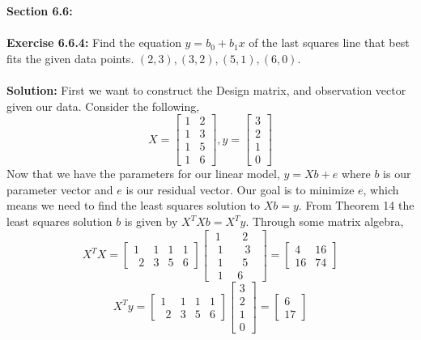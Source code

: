 \documentclass{amsart}
\begin{document}
\thispagestyle{fancy}





{\huge\textbf{Section 6.6:}}\\\\
\noindent\textbf{Exercise 6.6.4: } Find the equation $y = b_0 + b_1x$ of the last squares line that best fits the given data points. $(2,3), (3,2), (5,1), (6,0)$.\\\\
\noindent \textbf{Solution: } First we want to construct the Design matrix, and observation vector given our data. Consider the following,
\begin{equation*}
X = 
\begin{bmatrix}
 1 &   2   \\
 1 &    3  \\
 1 &   5 \\
 1& 6
\end{bmatrix}
,
y = 
\begin{bmatrix}
3\\
2\\
1\\
0
\end{bmatrix}
\end{equation*}
Now that we have the parameters for our linear model, $y  = Xb + e$ where $b$ is our parameter vector and $e$ is our residual vector. Our goal is to minimize $e$, which means we need to find the least squares solution to $Xb = y$. From Theorem 14 the least squares solution $b$ is given by $X^TXb = X^Ty$. Through some matrix algebra,
\begin{equation*}
X^TX = \begin{bmatrix}1&1&1&1\\ \:\:2&3&5&6\end{bmatrix}\begin{bmatrix}\:1\:&\:\:\:2\:\:\:\\ \:\:1\:&\:\:\:\:3\:\:\\ \:\:1\:&\:\:\:5\:\\ \:\:1&\:6\end{bmatrix}
 = 
\begin{bmatrix}4&16\\ 16&74\end{bmatrix}
\end{equation*}
\begin{equation*}
X^Ty =  \begin{bmatrix}1&1&1&1\\ \:\:2&3&5&6\end{bmatrix}\begin{bmatrix}
3\\
2\\
1\\
0
\end{bmatrix} = \begin{bmatrix}6\\ 17\end{bmatrix}
\end{equation*}
\end{document}

